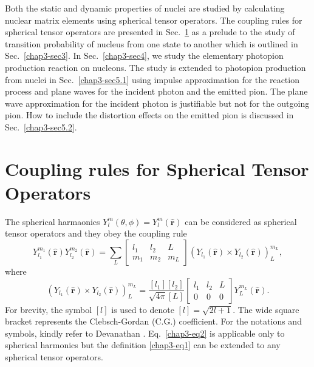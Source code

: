 Both the static and dynamic properties of nuclei are studied by calculating nuclear matrix elements using spherical tensor operators. The coupling rules for spherical tensor operators are presented in Sec.\ \ref{chap3-sec2} as a prelude to the study of transition probability of nucleus from one state to another which is outlined in Sec.\ \ref{chap3-sec3}. In Sec.\ \ref{chap3-sec4}, we study the elementary photopion production reaction on nucleons. The study is extended to photopion production from nuclei in Sec.\ \ref{chap3-sec5.1} using impulse approximation for the reaction process and plane waves for the incident photon and the emitted pion. The plane wave approximation for the incident photon is justifiable but not for the outgoing pion. How to include the distortion effects on the emitted pion is discussed in Sec.\ \ref{chap3-sec5.2}.

\section{Coupling rules for Spherical Tensor Operators} \label{chap3-sec2}

The spherical harmaonics $Y^m_l(\theta, \phi)= Y_l^m (\hat{{\boldsymbol  r}})$ can be considered as spherical tensor operators and they obey the coupling rule
\begin{equation}
Y_{l_1}^{m_1} (\hat{{\boldsymbol  r}}) Y_{l_2}^{m_2} (\hat{{\boldsymbol  r}}) = \sum_L 
	\begin{bmatrix}
		l_1 & l_2 & L\\
		m_1 &m_2  & m_L
	\end{bmatrix}
(Y_{l_1} (\hat{{\boldsymbol  r}}) \times Y_{l_2} (\hat{{\boldsymbol  r}}))^{m_L}_{L}, \label{chap3-eq1}
\end{equation}
where
\begin{equation}
(Y_{l_1}  (\hat{{\boldsymbol  r}})  \times Y_{l_2} (\hat{{\boldsymbol  r}}) )^{m_L}_{L} = \frac{[l_1][l_2]}{\sqrt{4\pi}[L]}
\begin{bmatrix}
l_1 & l_2 & L\\
0 & 0 & 0
\end{bmatrix}
Y_{L}^{m_L} (\hat{{\boldsymbol  r}}). \label{chap3-eq2} 
\end{equation}
For brevity, the symbol $[l]$ is used to denote $[l]=\sqrt{2l+1}$. The wide square bracket represents the Clebsch-Gordan (C.G.) coefficient. For the notations and symbols, kindly refer to Devanathan \cite{chap3-key11,chap3-key12}. Eq.~\eqref{chap3-eq2} is applicable only to spherical harmonics but the definition \eqref{chap3-eq1} can be extended to any spherical tensor operators.

